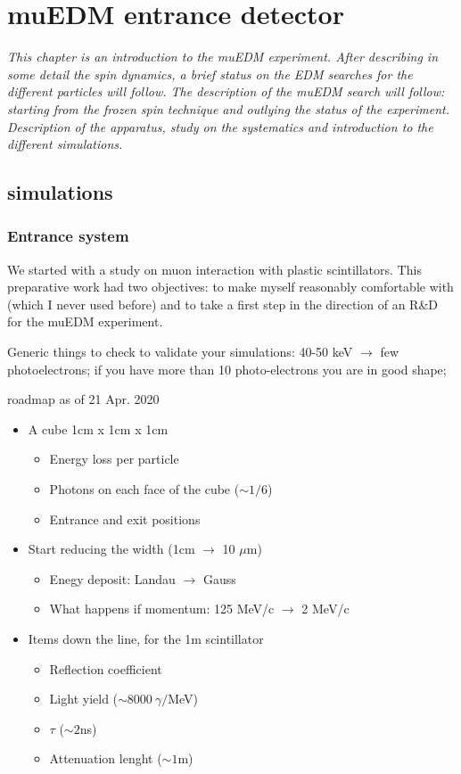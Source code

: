 \chapter{muEDM entrance detector}
\begin{refsection}

{\itshape
This chapter is an introduction to the muEDM experiment. After describing in some detail the spin dynamics, a brief status on the EDM searches for the different particles will follow.
The description of the muEDM search will follow: starting from the frozen spin technique and outlying the status of the experiment. 
Description of the apparatus, study on the systematics and introduction to the different simulations.}

\section{\gf simulations}
\subsection{Entrance system}
We started with a study on muon interaction with plastic scintillators. This preparative work had two objectives: to make myself reasonably comfortable with \gf (which I never used before) and to take a first step in the direction of an R\&D for the muEDM experiment.

Generic things to check to validate your simulations: 40-50 keV $\rightarrow$ few photoelectrons; if you have more than 10 photo-electrons you are in good shape;

roadmap as of 21 Apr. 2020
\begin{itemize}
\item A cube 1cm x 1cm x 1cm
\begin{itemize}
\item Energy loss per particle
\item Photons on each face of the cube ($\sim 1/6$)
\item Entrance and exit positions
\end{itemize}
\item Start reducing the width (1cm $\rightarrow$ 10 $\mu$m)
\begin{itemize}
\item Enegy deposit: Landau $\rightarrow$ Gauss
\item What happens if momentum: 125 MeV/c $\rightarrow$ 2 MeV/c
\end{itemize}
\item Items down the line, for the 1m scintillator
\begin{itemize}
\item Reflection coefficient
\item Light yield ($\sim 8000\ \gamma/$MeV)
\item $\tau$ ($\sim 2$ns)
\item Attenuation lenght ($\sim 1$m)
\end{itemize}
\end{itemize}


\end{refsection}
